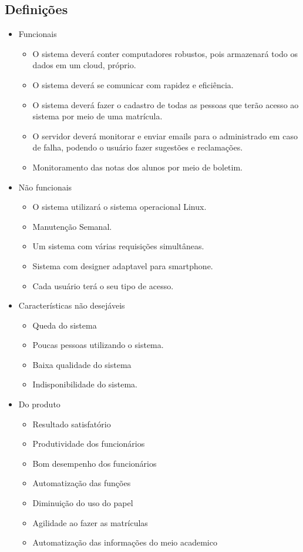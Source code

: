      \subsection{Definições}
       \begin{itemize}
        \item Funcionais
           \begin{itemize}
            \item O sistema deverá conter computadores robustos, pois armazenará todo os dados em um cloud, próprio.
            \item O sistema deverá se comunicar com rapidez e eficiência.
            \item O sistema deverá fazer o cadastro de todas as pessoas que terão acesso ao sistema por meio de uma matrícula.
            \item O servidor deverá monitorar e enviar emails para o administrado em caso de falha, podendo o usuário fazer sugestões e reclamações.
	        \item Monitoramento das notas dos alunos por meio de boletim.
           \end{itemize}
           
         \item Não funcionais
           \begin{itemize}
            \item O sistema utilizará o sistema operacional Linux.
            \item Manutenção Semanal.
            \item Um sistema com várias requisições simultâneas.
            \item Sistema com designer adaptavel para smartphone.
            \item Cada usuário terá o seu tipo de acesso.
           \end{itemize}

        \item Características não desejáveis
	 \begin{itemize}
	        \item Queda do sistema
			\item Poucas pessoas utilizando o sistema.
	     	\item Baixa qualidade do sistema
	 		\item Indisponibilidade do sistema.
	 \end{itemize}
	 
	 \item Do produto
	 \begin{itemize}
	        \item Resultado satisfatório
	 		\item Produtividade dos funcionários
	 		\item Bom desempenho dos funcionários
	  		\item Automatização das funções
	  		\item Diminuição do uso do papel
	  		\item Agilidade ao fazer as matrículas
	  		\item Automatização das informações do meio academico
	 \end{itemize} 
	 

\end{itemize}
